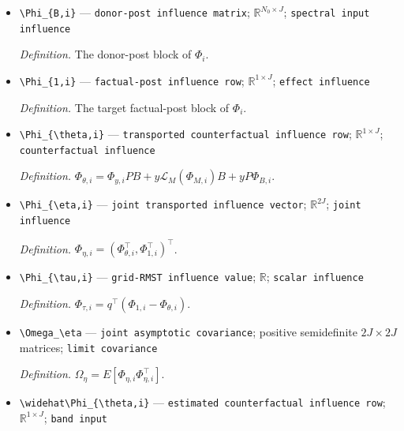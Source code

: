 \documentclass{article}
\begin{document}
\begin{itemize}
  \par\smallskip\noindent\emph{Definition.} The donor-pre block of \(\Phi_i\).
  \item \texttt{\textbackslash{}\allowbreak{}Phi\_\allowbreak{}\{B,\allowbreak{}i\}\allowbreak{}} --- \texttt{donor-\allowbreak{}post influence matrix}; \(\mathbb R^{N_0\times J}\); \texttt{spectral input influence}
  \par\smallskip\noindent\emph{Definition.} The donor-post block of \(\Phi_i\).
  \item \texttt{\textbackslash{}\allowbreak{}Phi\_\allowbreak{}\{1,\allowbreak{}i\}\allowbreak{}} --- \texttt{factual-\allowbreak{}post influence row}; \(\mathbb R^{1\times J}\); \texttt{effect influence}
  \par\smallskip\noindent\emph{Definition.} The target factual-post block of \(\Phi_i\).
  \item \texttt{\textbackslash{}\allowbreak{}Phi\_\allowbreak{}\{\textbackslash{}\allowbreak{}theta,\allowbreak{}i\}\allowbreak{}} --- \texttt{transported counterfactual influence row}; \(\mathbb R^{1\times J}\); \texttt{counterfactual influence}
  \par\smallskip\noindent\emph{Definition.} \(\Phi_{\theta,i}=\Phi_{y,i}PB+y\mathcal L_M(\Phi_{M,i})B+yP\Phi_{B,i}\).
  \item \texttt{\textbackslash{}\allowbreak{}Phi\_\allowbreak{}\{\textbackslash{}\allowbreak{}eta,\allowbreak{}i\}\allowbreak{}} --- \texttt{joint transported influence vector}; \(\mathbb R^{2J}\); \texttt{joint influence}
  \par\smallskip\noindent\emph{Definition.} \(\Phi_{\eta,i}=(\Phi_{\theta,i}^\top,\Phi_{1,i}^\top)^\top\).
  \item \texttt{\textbackslash{}\allowbreak{}Phi\_\allowbreak{}\{\textbackslash{}\allowbreak{}tau,\allowbreak{}i\}\allowbreak{}} --- \texttt{grid-\allowbreak{}RMST influence value}; \(\mathbb R\); \texttt{scalar influence}
  \par\smallskip\noindent\emph{Definition.} \(\Phi_{\tau,i}=q^\top(\Phi_{1,i}-\Phi_{\theta,i})\).
  \item \texttt{\textbackslash{}\allowbreak{}Omega\_\allowbreak{}\textbackslash{}\allowbreak{}eta} --- \texttt{joint asymptotic covariance}; positive semidefinite \(2J\times2J\) matrices; \texttt{limit covariance}
  \par\smallskip\noindent\emph{Definition.} \(\Omega_\eta=E[\Phi_{\eta,i}\Phi_{\eta,i}^\top]\).
  \item \texttt{\textbackslash{}\allowbreak{}widehat\textbackslash{}\allowbreak{}Phi\_\allowbreak{}\{\textbackslash{}\allowbreak{}theta,\allowbreak{}i\}\allowbreak{}} --- \texttt{estimated counterfactual influence row}; \(\mathbb R^{1\times J}\); \texttt{band input}

\end{itemize}
\end{document}
